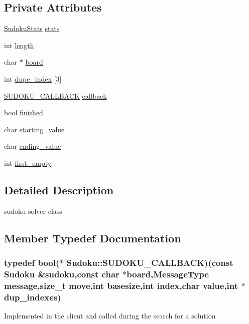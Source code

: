 \subsection*{Private Attributes}
\begin{DoxyCompactItemize}
\item 
\hyperlink{structSudoku_1_1SudokuStats}{Sudoku\-Stats} \hyperlink{classSudoku_a4e3db7bee575395d9336b78963b8d426}{stats}
\item 
int \hyperlink{classSudoku_a80bd89d6732a9c2eae7acec7bacd18c6}{length}
\item 
char $\ast$ \hyperlink{classSudoku_a2c25d58e03cdc46ec8774a449fd32d81}{board}
\item 
int \hyperlink{classSudoku_a0287c0bedbbcac2944df596d5aa11248}{dupe\-\_\-index} \mbox{[}3\mbox{]}
\item 
\hyperlink{classSudoku_ab9d5a4c123c93f3afb066e5f83149c57}{S\-U\-D\-O\-K\-U\-\_\-\-C\-A\-L\-L\-B\-A\-C\-K} \hyperlink{classSudoku_a276e4848efaf2ab0738752016059bd4d}{callback}
\item 
bool \hyperlink{classSudoku_a21c5551563e8963784c949772b2bc684}{finished}
\item 
char \hyperlink{classSudoku_a5a3590e872546b88aab9057476c8c78d}{starting\-\_\-value}
\item 
char \hyperlink{classSudoku_a303d3b9e8bf9ae3f2733648cb2e85c09}{ending\-\_\-value}
\item 
int \hyperlink{classSudoku_ac25a6f7bcd1b179b63d4d14a111fcfca}{first\-\_\-empty}
\end{DoxyCompactItemize}


\subsection{Detailed Description}
sudoku solver class 

\subsection{Member Typedef Documentation}
\hypertarget{classSudoku_ab9d5a4c123c93f3afb066e5f83149c57}{
\subsubsection[{S\-U\-D\-O\-K\-U\-\_\-\-C\-A\-L\-L\-B\-A\-C\-K}]{\setlength{\rightskip}{0pt plus 5cm}typedef bool($\ast$ Sudoku\-::\-S\-U\-D\-O\-K\-U\-\_\-\-C\-A\-L\-L\-B\-A\-C\-K)(const {\bf Sudoku} \&sudoku,const char $\ast${\bf board},{\bf Message\-Type} message,size\-\_\-t move,int basesize,int index,char value,int $\ast$dup\-\_\-indexes)}}\label{classSudoku_ab9d5a4c123c93f3afb066e5f83149c57}
Implemented in the client and called during the search for a solution 

